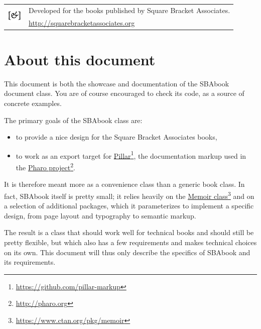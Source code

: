 \documentclass[twoside,openany,showtrims]{sbabook}
\newcommand\hrefnote[3][]{%
  \href{#2}{#3}\footnote{\url{#2} #1}}
\begin{document}
{  \vfill

  \begin{tabular}{@{}c@{\quad}l}
    \multirow{2}{*}{\includegraphics[width=2em]{sba-logo.pdf}}
    & Developed for the books published by Square Bracket Associates. \\
    & \url{http://squarebracketassociates.org} \\[\smallskipamount]
  \end{tabular}
}


\frontmatter
\pagestyle{plain}

\chapter*{About this document}

This document is both the showcase and documentation of the SBAbook document
class.
You are of course encouraged to check its code, as a source of concrete examples.

The primary goals of the SBAbook class are:
\begin{itemize}
\item to provide a nice design for the Square Bracket Associates books,
\item to work as an export target for
  \hrefnote{https://github.com/pillar-markup}{Pillar}, the documentation markup
  used in the \hrefnote{http://pharo.org}{Pharo project}.
\end{itemize}
It is therefore meant more as a convenience class than a generic book class.
In fact, SBAbook itself is pretty small; it relies heavily on the
\hrefnote{https://www.ctan.org/pkg/memoir}{Memoir class} and on a selection of
additional packages, which it parameterizes to implement a specific design, from
page layout and typography to semantic markup.

The result is a class that should work well for technical books and should still
be pretty flexible, but which also has a few requirements and makes technical
choices on its own.
This document will thus only describe the specifics of SBAbook and its requirements.


\tableofcontents*

\clearpage
\listoffigures

\mainmatter


\end{document}
